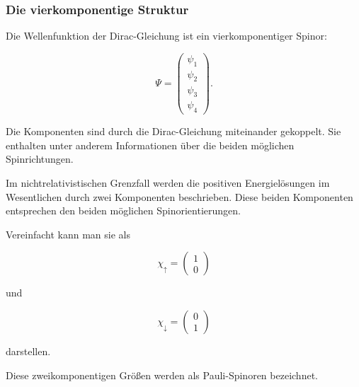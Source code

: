 \subsubsection*{Die vierkomponentige Struktur}

Die Wellenfunktion der Dirac-Gleichung ist ein vierkomponentiger
Spinor:

\begin{equation}
	\Psi
	=
	\begin{pmatrix}
		\psi_1 \\
		\psi_2 \\
		\psi_3 \\
		\psi_4
	\end{pmatrix}.
	\label{eq:dirac_spinor_spinstruktur}
\end{equation}

Die Komponenten sind durch die Dirac-Gleichung miteinander gekoppelt.
Sie enthalten unter anderem Informationen über die beiden möglichen
Spinrichtungen.

Im nichtrelativistischen Grenzfall werden die positiven
Energielösungen im Wesentlichen durch zwei Komponenten beschrieben.
Diese beiden Komponenten entsprechen den beiden möglichen
Spinorientierungen.

Vereinfacht kann man sie als

\begin{equation}
	\chi_{\uparrow}
	=
	\begin{pmatrix}
		1 \\
		0
	\end{pmatrix}
\end{equation}

und

\begin{equation}
	\chi_{\downarrow}
	=
	\begin{pmatrix}
		0 \\
		1
	\end{pmatrix}
\end{equation}

darstellen.

Diese zweikomponentigen Größen werden als Pauli-Spinoren%
 bezeichnet.


